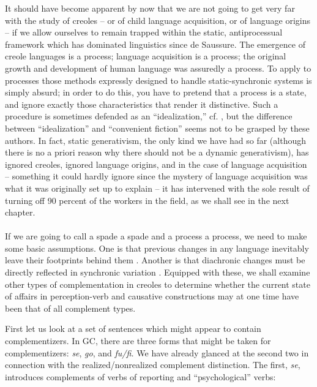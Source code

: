 It should have become apparent by now that we are not going to get very far with the study of creoles -- or of child language acquisition, or of language origins -- if we allow ourselves to remain trapped within the static, antiprocessual framework which has dominated linguistics since de Saussure. The emergence of creole languages is a process; language acquisition is a process; the original growth and development of human language was assuredly a process. To apply to processes those methods expressly designed to handle static-synchronic systems is simply absurd; in order to do this, you have to pretend that a process
is a state, and ignore exactly those characteristics that render it distinc\-tive. Such a procedure is sometimes defended as an ``idealization,'' cf. \citet[Chapter 8]{ChomskyEtAl1968}, but the difference between ``idealization'' and ``convenient fiction'' seems not to be grasped by these authors. In fact, static generativism, the only kind we have had so far (although there is no a priori reason why there should not be a dynamic generativism), has ignored creoles, ignored language origins, and in the case of language acquisition -- something it could hardly ignore since the mystery of language acquisition was what it was originally set up to explain -- it has intervened with the sole result of turning off 90 percent of the workers in the field, as we shall see in the next chapter.\\\\

If we are going to call a spade a spade and a process a process, we need to make some basic assumptions. One is that previous changes in any language inevitably leave their footprints behind them \citep{Givón1971}. Another is that diachronic changes must be directly reflected in synchronic variation \citep{WeinreichEtAl1968,Bickerton1975,Bailey1973}. Equipped with these, we shall examine other types of complementation in creoles to determine whether the current state of affairs in perception-verb and causative constructions may at one time have been that of all complement types.

First let us look at a set of sentences which might appear to contain complementizers. In GC, there are three forms that might be taken for complementizers: \textit{se}, \textit{go}, and \textit{fu/fi.} We have already glanced at the second two in connection with the realized/nonrealized com\-plement distinction. The first, \textit{se}, introduces complements of verbs of reporting and ``psychological'' verbs:


